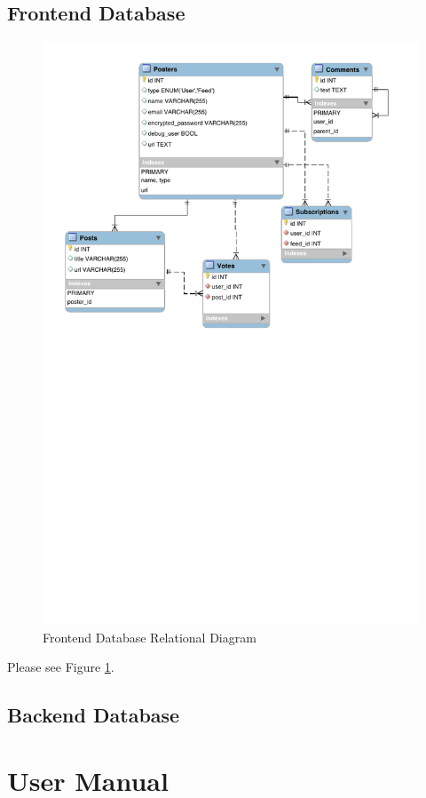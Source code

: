 \documentclass[11pt,letterpaper]{article}
\begin{document}
\subsection{Frontend Database}
\begin{figure}
\centering
\includegraphics{db_diagram.pdf}
\caption{Frontend Database Relational Diagram}
\label{fig:database}
\end{figure}
Please see Figure \ref{fig:database}.
\subsection{Backend Database}

\section{User Manual}
\end{document}
